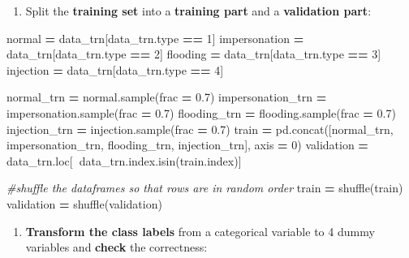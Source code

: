 \documentclass[]{book}
\newenvironment{Shaded}{\begin{snugshade}}{\end{snugshade}}
\newcommand{\DecValTok}[1]{\textcolor[rgb]{0.00,0.00,0.81}{#1}}
\newcommand{\FloatTok}[1]{\textcolor[rgb]{0.00,0.00,0.81}{#1}}
\newcommand{\CommentTok}[1]{\textcolor[rgb]{0.56,0.35,0.01}{\textit{#1}}}
\newcommand{\OperatorTok}[1]{\textcolor[rgb]{0.81,0.36,0.00}{\textbf{#1}}}
\newcommand{\BuiltInTok}[1]{#1}
\newcommand{\NormalTok}[1]{#1}
\providecommand{\tightlist}{%
  \setlength{\itemsep}{0pt}\setlength{\parskip}{0pt}}
\begin{document}
\begin{enumerate}
\def\labelenumi{\arabic{enumi}.}
\setcounter{enumi}{99}
\tightlist
\item
  Split the \textbf{training set} into a \textbf{training part} and a \textbf{validation part}:
\end{enumerate}

\begin{Shaded}
\begin{Highlighting}[]
\NormalTok{normal }\OperatorTok{=}\NormalTok{ data_trn[data_trn.}\BuiltInTok{type} \OperatorTok{==} \DecValTok{1}\NormalTok{]}
\NormalTok{impersonation }\OperatorTok{=}\NormalTok{ data_trn[data_trn.}\BuiltInTok{type} \OperatorTok{==} \DecValTok{2}\NormalTok{]}
\NormalTok{flooding }\OperatorTok{=}\NormalTok{ data_trn[data_trn.}\BuiltInTok{type} \OperatorTok{==} \DecValTok{3}\NormalTok{]}
\NormalTok{injection }\OperatorTok{=}\NormalTok{ data_trn[data_trn.}\BuiltInTok{type} \OperatorTok{==} \DecValTok{4}\NormalTok{]}

\NormalTok{normal_trn }\OperatorTok{=}\NormalTok{ normal.sample(frac }\OperatorTok{=} \FloatTok{0.7}\NormalTok{)}
\NormalTok{impersonation_trn }\OperatorTok{=}\NormalTok{ impersonation.sample(frac }\OperatorTok{=} \FloatTok{0.7}\NormalTok{)}
\NormalTok{flooding_trn }\OperatorTok{=}\NormalTok{ flooding.sample(frac }\OperatorTok{=} \FloatTok{0.7}\NormalTok{)}
\NormalTok{injection_trn }\OperatorTok{=}\NormalTok{ injection.sample(frac }\OperatorTok{=} \FloatTok{0.7}\NormalTok{)}
\NormalTok{train }\OperatorTok{=}\NormalTok{ pd.concat([normal_trn, impersonation_trn, flooding_trn, injection_trn], axis }\OperatorTok{=} \DecValTok{0}\NormalTok{)}
\NormalTok{validation }\OperatorTok{=}\NormalTok{ data_trn.loc[}\OperatorTok{~}\NormalTok{data_trn.index.isin(train.index)]}

\CommentTok{#shuffle the dataframes so that rows are in random order}
\NormalTok{train }\OperatorTok{=}\NormalTok{ shuffle(train)}
\NormalTok{validation }\OperatorTok{=}\NormalTok{ shuffle(validation)}
\end{Highlighting}
\end{Shaded}

\begin{enumerate}
\def\labelenumi{\arabic{enumi}.}
\setcounter{enumi}{100}
\tightlist
\item
  \textbf{Transform the class labels} from a categorical variable to 4 dummy variables and \textbf{check} the correctness:
\end{enumerate}
\end{document}
